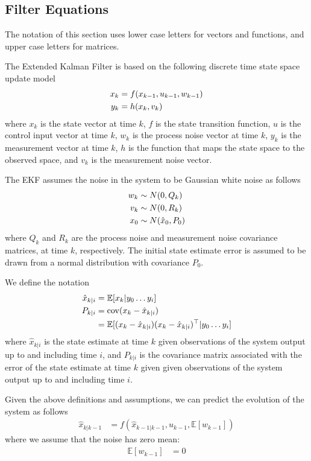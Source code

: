 \documentclass[]{article}
\begin{document}
{\subsection{Filter Equations} %
\label{sub:filter_equations}
The notation of this section uses lower case letters for vectors and functions, and upper case letters for matrices. 

The Extended Kalman Filter is based on the following discrete time state space update model
\begin{align}
	x_k &= f(x_{k-1}, u_{k-1}, w_{k-1}) \notag \\
	y_k &= h(x_k, v_k)
	\label{eqn:system}
\end{align}
where $x_k$ is the state vector at time $k$, $f$ is the state transition function, $u$ is the control input vector at time $k$, $w_k$ is the process noise vector at time $k$, $y_k$ is the measurement vector at time $k$, $h$ is the function that maps the state space to the observed space, and $v_k$ is the measurement noise vector.

The EKF assumes the noise in the system to be Gaussian white noise as follows
\begin{align}
	w_k &\sim N(0,Q_k) \notag \\
	v_k &\sim N(0,R_k) \notag \\
	x_0 &\sim N(\hat{x}_0,P_0)
	\label{eqn:noisedef}
\end{align}
where $Q_k$ and $R_k$ are the process noise and measurement noise covariance matrices, at time $k$, respectively. The initial state estimate error is assumed to be drawn from a normal distribution with covariance $P_0$.

We define the notation
\begin{align}
	\hat{x}_{k|i} 	&= \mathbb{E}[x_k|y_0 \hdots y_i] \\
	P_{k|i} 		&= \operatorname{cov}(x_k - \hat{x}_{k|i}) \notag \\
					&= \mathbb{E}[ (x_k-\hat{x}_{k|i}) (x_k-\hat{x}_{k|i})^\top | y_0 \hdots y_i]
\end{align}
where $\hat{x}_{k|i}$ is the state estimate at time $k$ given observations of the system output up to and including time $i$, and $P_{k|i}$ is the covariance matrix associated with the error of the state estimate at time $k$ given given observations of the system output up to and including time $i$.

Given the above definitions and assumptions, we can predict the evolution of the system as follows
\begin{align}
	\hat{x}_{k|k-1} &= f(\hat{x}_{k-1|k-1}, u_{k-1}, \mathbb{E}[w_{k-1}])
	\label{eqn:predictx}
\end{align}
where we assume that the noise has zero mean:
\begin{align}
	\mathbb{E}[w_{k-1}] &= 0
\end{align}

}
\end{document}
